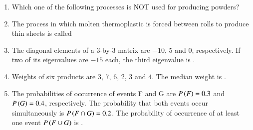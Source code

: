 \documentclass[journal,12pt,onecolumn]{IEEEtran}
\theoremstyle{remark}
\begin{document}
\begin{enumerate}
\item Which one of the following processes is NOT used for producing powders?

\hfill{}

\begin{enumerate}
\end{enumerate}

\item The process in which molten thermoplastic is forced between rolls to produce thin sheets is called

\hfill{}

\begin{enumerate}
\end{enumerate}

\item The diagonal elements of a 3-by-3 matrix are $-10$, $5$ and $0$, respectively. If two of its eigenvalues are $-15$ each, the third eigenvalue is \underline{\hspace{2cm}}.

\hfill{}

\item Weights  of six products are $3$, $7$, $6$, $2$, $3$ and $4$. The median weight  is \underline{\hspace{2cm}}.

\hfill{}

\item The probabilities of occurrence of events F and G are $P\left(F\right)=0.3$ and $P\left(G\right)=0.4$, respectively. The probability that both events occur simultaneously is $P\left(F \cap G\right)=0.2$. The probability of occurrence of at least one event $P\left(F \cup G\right)$ is \underline{\hspace{2cm}}.


\end{enumerate}
\end{document}
